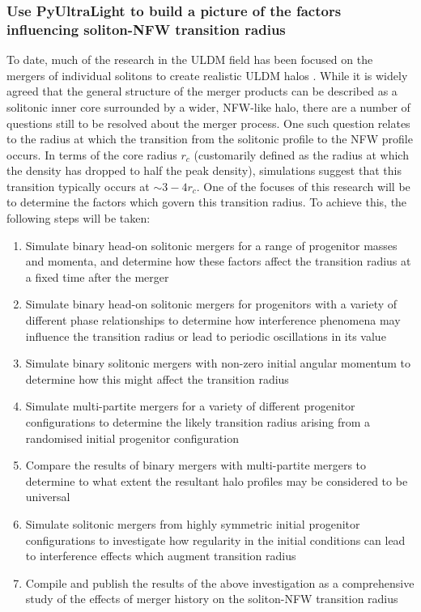 \subsubsection{Use PyUltraLight to build a picture of the factors influencing soliton-NFW transition radius}

To date, much of the research in the ULDM field has been focused on the mergers of individual solitons to create realistic ULDM halos \cite{Veltmaat:2016rxo, Schive:2014hza}. While it is widely agreed that the general structure of the merger products can be described as a solitonic inner core surrounded by a wider, NFW-like halo, there are a number of questions still to be resolved about the merger process. One such question relates to the radius at which the transition from the solitonic profile to the NFW profile occurs. In terms of the core radius $r_c$ (customarily defined as the radius at which the density has dropped to half the peak density), simulations suggest that this transition typically occurs at $\sim 3-4r_c$. One of the focuses of this research will be to determine the factors which govern this transition radius. To achieve this, the following steps will be taken:
\begin{enumerate}
    \item Simulate binary head-on solitonic mergers for a range of progenitor masses and momenta, and determine how these factors affect the transition radius at a fixed time after the merger
    \item Simulate binary head-on solitonic mergers for progenitors with a variety of different phase relationships to determine how interference phenomena may influence the transition radius or lead to periodic oscillations in its value
    \item Simulate binary solitonic mergers with non-zero initial angular momentum to determine how this might affect the transition radius
    \item Simulate multi-partite mergers for a variety of different progenitor configurations to determine the likely transition radius arising from a randomised initial progenitor configuration
    \item Compare the results of binary mergers with multi-partite mergers to determine to what extent the resultant halo profiles may be considered to be universal
    \item Simulate solitonic mergers from highly symmetric initial progenitor configurations to investigate how regularity in the initial conditions can lead to interference effects which augment transition radius
    \item Compile and publish the results of the above investigation as a comprehensive study of the effects of merger history on the soliton-NFW transition radius 
    
\end{enumerate}

